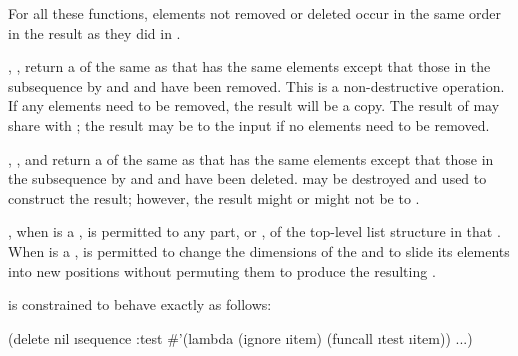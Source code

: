 For all these functions,
elements 
not removed or deleted occur in the same order in the result
as they did in .

, ,  return
a 
of the same  as 
that has the same elements except that those in the subsequence
 by  and  and 
have been removed.  
This is a non-destructive operation. If any
elements need to be removed, the result will be a copy.
The result of  may share
with ; 
the result may be  to the input 
if no elements need to be removed.

, , and 
return a  
of the same  as 
that has the same elements except that those in the subsequence
 by  and  and 
have been deleted. 
 may be destroyed and used to construct
the result; however, the result might or might not be  
to .

, when  is a , is permitted to 
 any part,  or , of the
top-level list structure in that .
When  is a ,   is 
permitted to change the dimensions of the  
and to slide its elements into new positions without
permuting them to produce the resulting .

 is constrained to behave exactly as follows:

\code
 (delete nil \i{sequence}
             :test #'(lambda (ignore \i{item}) (funcall \i{test} \i{item}))
             ...)
\endcode
 

